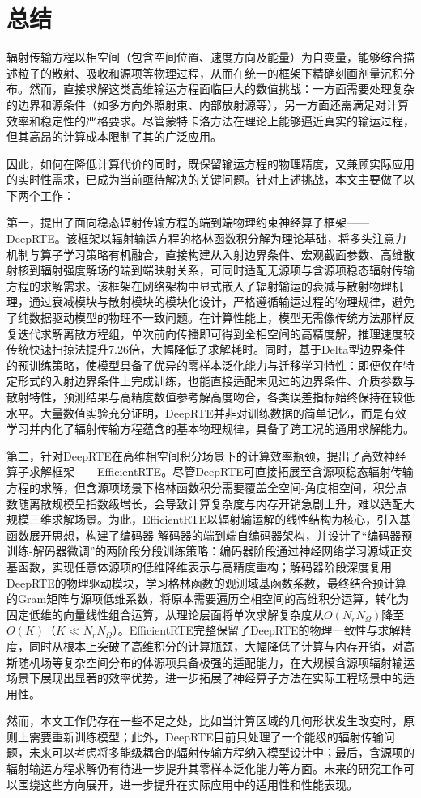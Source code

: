\chapter{总结}

辐射传输方程以相空间（包含空间位置、速度方向及能量）为自变量，能够综合描述粒子的散射、吸收和源项等物理过程，从而在统一的框架下精确刻画剂量沉积分布。然而，直接求解这类高维输运方程面临巨大的数值挑战：一方面需要处理复杂的边界和源条件（如多方向外照射束、内部放射源等），另一方面还需满足对计算效率和稳定性的严格要求。尽管蒙特卡洛方法在理论上能够逼近真实的输运过程，但其高昂的计算成本限制了其的广泛应用。

因此，如何在降低计算代价的同时，既保留输运方程的物理精度，又兼顾实际应用的实时性需求，已成为当前亟待解决的关键问题。针对上述挑战，本文主要做了以下两个工作：

第一，提出了面向稳态辐射传输方程的端到端物理约束神经算子框架——DeepRTE。该框架以辐射输运方程的格林函数积分解为理论基础，将多头注意力机制与算子学习策略有机融合，直接构建从入射边界条件、宏观截面参数、高维散射核到辐射强度解场的端到端映射关系，可同时适配无源项与含源项稳态辐射传输方程的求解需求。该框架在网络架构中显式嵌入了辐射输运的衰减与散射物理机理，通过衰减模块与散射模块的模块化设计，严格遵循输运过程的物理规律，避免了纯数据驱动模型的物理不一致问题。在计算性能上，模型无需像传统方法那样反复迭代求解离散方程组，单次前向传播即可得到全相空间的高精度解，推理速度较传统快速扫掠法提升7.26倍，大幅降低了求解耗时。同时，基于Delta型边界条件的预训练策略，使模型具备了优异的零样本泛化能力与迁移学习特性：即便仅在特定形式的入射边界条件上完成训练，也能直接适配未见过的边界条件、介质参数与散射特性，预测结果与高精度数值参考解高度吻合，各类误差指标始终保持在较低水平。大量数值实验充分证明，DeepRTE并非对训练数据的简单记忆，而是有效学习并内化了辐射传输方程蕴含的基本物理规律，具备了跨工况的通用求解能力。

第二，针对DeepRTE在高维相空间积分场景下的计算效率瓶颈，提出了高效神经算子求解框架——EfficientRTE。尽管DeepRTE可直接拓展至含源项稳态辐射传输方程的求解，但含源项场景下格林函数积分需要覆盖全空间-角度相空间，积分点数随离散规模呈指数级增长，会导致计算复杂度与内存开销急剧上升，难以适配大规模三维求解场景。为此，EfficientRTE以辐射输运解的线性结构为核心，引入基函数展开思想，构建了编码器-解码器的端到端自编码器架构，并设计了“编码器预训练-解码器微调”的两阶段分段训练策略：编码器阶段通过神经网络学习源域正交基函数，实现任意体源项的低维降维表示与高精度重构；解码器阶段深度复用DeepRTE的物理驱动模块，学习格林函数的观测域基函数系数，最终结合预计算的Gram矩阵与源项低维系数，将原本需要遍历全相空间的高维积分运算，转化为固定低维的向量线性组合运算，从理论层面将单次求解复杂度从$O(N_r N_\Omega)$降至$O(K)$（$K \ll N_r N_\Omega$）。EfficientRTE完整保留了DeepRTE的物理一致性与求解精度，同时从根本上突破了高维积分的计算瓶颈，大幅降低了计算与内存开销，对高斯随机场等复杂空间分布的体源项具备极强的适配能力，在大规模含源项辐射输运场景下展现出显著的效率优势，进一步拓展了神经算子方法在实际工程场景中的适用性。

然而，本文工作仍存在一些不足之处，比如当计算区域的几何形状发生改变时，原则上需要重新训练模型；此外，DeepRTE目前只处理了一个能级的辐射传输问题，未来可以考虑将多能级耦合的辐射传输方程纳入模型设计中；最后，含源项的辐射输运方程求解仍有待进一步提升其零样本泛化能力等方面。未来的研究工作可以围绕这些方向展开，进一步提升在实际应用中的适用性和性能表现。